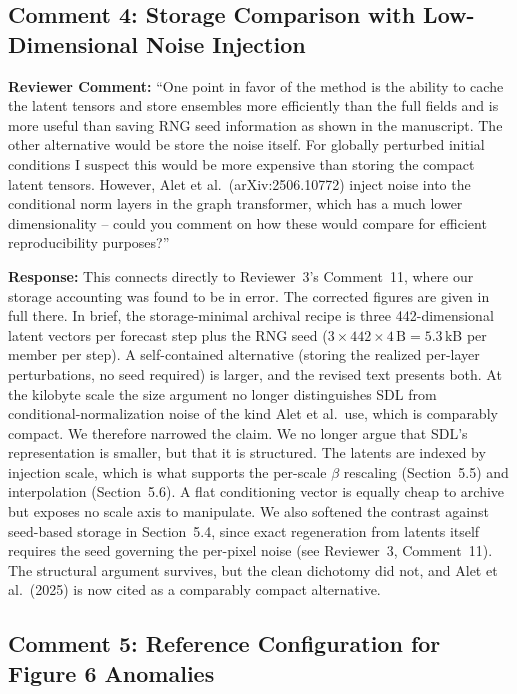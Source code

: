 \documentclass[12pt]{article}
\begin{document}
\subsection*{Comment 4: Storage Comparison with Low-Dimensional Noise Injection}

\textbf{Reviewer Comment:} ``One point in favor of the method is the ability to cache
the latent tensors and store ensembles more efficiently than the full fields and is
more useful than saving RNG seed information as shown in the manuscript. The other
alternative would be store the noise itself. For globally perturbed initial conditions
I suspect this would be more expensive than storing the compact latent tensors.
However, Alet et al.\ (arXiv:2506.10772) inject noise into the conditional norm layers
in the graph transformer, which has a much lower dimensionality -- could you comment
on how these would compare for efficient reproducibility purposes?''

\textbf{Response:} This connects directly to Reviewer~3's Comment~11, where our
storage accounting was found to be in error. The corrected
figures are given in full there. In brief, the storage-minimal archival recipe is
three 442-dimensional latent vectors per forecast step plus the RNG seed
($3\times442\times4\,\mathrm{B}=5.3$\,kB per member per step). A self-contained
alternative (storing the realized per-layer perturbations, no seed required) is
larger, and the revised text presents both. At the kilobyte scale the size
argument no longer distinguishes SDL from conditional-normalization noise of the kind
Alet et al.\ use, which is comparably compact. We therefore narrowed the claim. We
no longer argue that SDL's representation is smaller, but that it is structured. The
latents are indexed by injection scale, which is what supports the per-scale
$\beta$ rescaling (Section~5.5) and interpolation (Section~5.6). A flat conditioning
vector is equally cheap to archive but exposes no scale axis to manipulate. We also
softened the contrast against seed-based storage in Section~5.4, since exact
regeneration from latents itself requires the seed governing the per-pixel noise (see
Reviewer~3, Comment~11). The structural argument survives, but the clean dichotomy did
not, and Alet et al.\ (2025) is now cited as a comparably compact alternative.

\subsection*{Comment 5: Reference Configuration for Figure 6 Anomalies}
\end{document}
